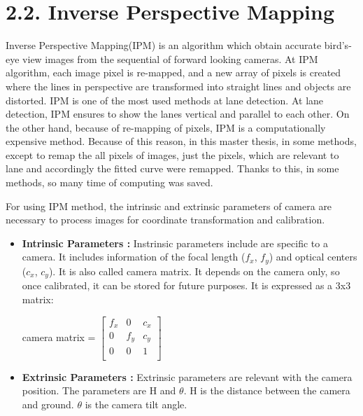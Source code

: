%
\section*{2.2. Inverse Perspective Mapping}\label{sec:Inverse Perspective Mapping}
%
Inverse Perspective Mapping(IPM) is an algorithm which obtain accurate bird's-eye view images from the sequential 
of forward looking cameras. At IPM algorithm, each image pixel is re-mapped, and a new array of pixels is created 
where the lines in perspective are transformed into straight lines and objects are distorted. IPM is one of the 
most used methods at lane detection. At lane detection, IPM ensures to show the lanes vertical and parallel to 
each other. On the other hand, because of re-mapping of pixels, IPM is a computationally expensive method. Because 
of this reason, in this master thesis, in some methods, except to remap the all pixels of images, just the pixels,
which are relevant to lane and accordingly the fitted curve were remapped. Thanks to this, in some methods, so many 
time of computing was saved.

For using IPM method, the intrinsic and extrinsic parameters of camera are necessary to process images for coordinate 
transformation and calibration. 

\begin{itemize}
 \item \textbf{Intrinsic Parameters :} Instrinsic parameters include are specific to a camera. It includes information
of the focal length ($f_x$, $f_y$) and optical centers ($c_x$, $c_y$). It is also called camera matrix. It depends on 
the camera only, so once calibrated, it can be stored for future purposes. It is expressed as a 3x3 matrix: 

 \begin{center}
  camera matrix =  $
 \begin{bmatrix} 
f_x & 0 & c_x \\
0 & f_y & c_y \\
0 & 0 & 1 \\
\end{bmatrix}
$  \end{center}

 \item \textbf{Extrinsic Parameters :} Extrinsic parameters are relevant with the camera position. The parameters are H 
 and $\theta$. H is the distance between the camera and ground. $\theta$ is the camera tilt angle. 
 
  \end{itemize}
  
